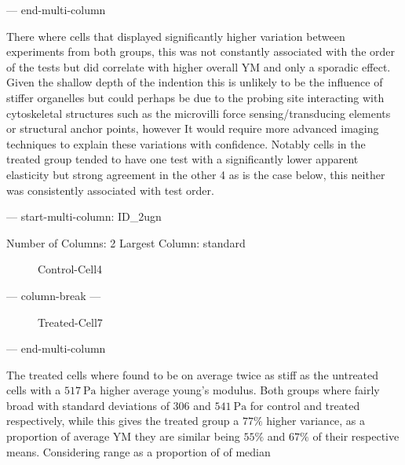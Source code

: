 \documentclass[
  paper=a4,
  ,captions=tableheading
]{scrartcl}
\makeatletter
\newenvironment{Shaded}{}{}
\newcommand{\NormalTok}[1]{#1}
\newcommand*\pandocbounded[1]{%
  \sbox\pandoc@box{#1}%
  \Gscale@div\@tempa{\textheight}{\dimexpr\ht\pandoc@box+\dp\pandoc@box\relax}%
  \Gscale@div\@tempb{\linewidth}{\wd\pandoc@box}%
  \ifdim\@tempb\p@<\@tempa\p@\let\@tempa\@tempb\fi%
  \ifdim\@tempa\p@<\p@\scalebox{\@tempa}{\usebox\pandoc@box}%
  \else\usebox{\pandoc@box}%
  \fi%
}
\makeatother
\begin{document}
--- end-multi-column

There where cells that displayed significantly higher variation between
experiments from both groups, this was not constantly associated with
the order of the tests but did correlate with higher overall YM and only
a sporadic effect. Given the shallow depth of the indention this is
unlikely to be the influence of stiffer organelles but could perhaps be
due to the probing site interacting with cytoskeletal structures such as
the microvilli force sensing/transducing elements or structural anchor
points, however It would require more advanced imaging techniques to
explain these variations with confidence. Notably cells in the treated
group tended to have one test with a significantly lower apparent
elasticity but strong agreement in the other 4 as is the case below,
this neither was consistently associated with test order.

--- start-multi-column: ID\_2ugn

\begin{Shaded}
\begin{Highlighting}[]
\NormalTok{Number of Columns: 2}
\NormalTok{Largest Column: standard}
\end{Highlighting}
\end{Shaded}

\begin{figure}
\centering
\pandocbounded{}
\caption{Control-Cell4}
\end{figure}

--- column-break ---

\begin{figure}
\centering
\pandocbounded{}
\caption{Treated-Cell7}
\end{figure}

--- end-multi-column

The treated cells where found to be on average twice as stiff as the
untreated cells with a \(517 \ \text{Pa}\) higher average young's
modulus. Both groups where fairly broad with standard deviations of
\(306\) and \(541 \ \text{Pa}\) for control and treated respectively,
while this gives the treated group a \(77\%\) higher variance, as a
proportion of average YM they are similar being \(55\%\) and \(67\%\) of
their respective means. Considering range as a proportion of of median
\end{document}
